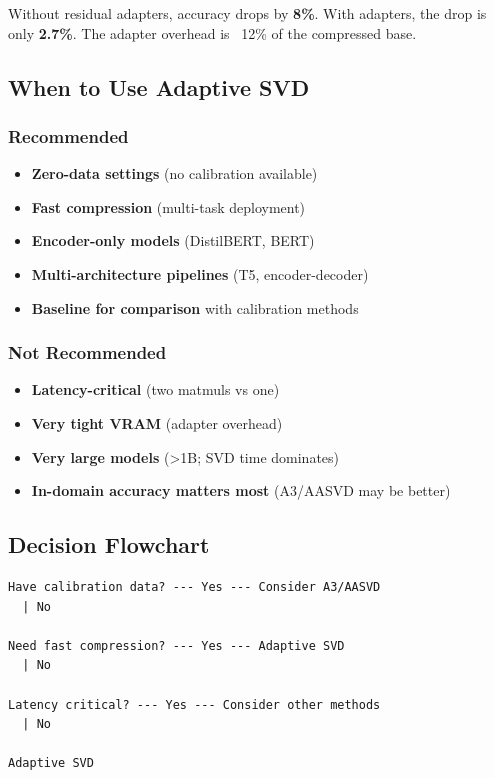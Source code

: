 Without residual adapters, accuracy drops by \textbf{8\%}. With 
adapters, the drop is only \textbf{2.7\%}. The adapter overhead is 
~12\% of the compressed base.

\subsection{When to Use Adaptive SVD}

\subsubsection{Recommended}

\begin{itemize}
\item \textbf{Zero-data settings} (no calibration available)
\item \textbf{Fast compression} (multi-task deployment)
\item \textbf{Encoder-only models} (DistilBERT, BERT)
\item \textbf{Multi-architecture pipelines} (T5, encoder-decoder)
\item \textbf{Baseline for comparison} with calibration methods

\end{itemize}
\subsubsection{Not Recommended}

\begin{itemize}
\item \textbf{Latency-critical} (two matmuls vs one)
\item \textbf{Very tight VRAM} (adapter overhead)
\item \textbf{Very large models} (\textgreater{}1B; SVD time dominates)
\item \textbf{In-domain accuracy matters most} (A3/AASVD may be better)

\end{itemize}
\subsection{Decision Flowchart}

\begin{lstlisting}
Have calibration data? --- Yes --- Consider A3/AASVD
  | No
   
Need fast compression? --- Yes --- Adaptive SVD
  | No
   
Latency critical? --- Yes --- Consider other methods
  | No
   
Adaptive SVD
\end{lstlisting}

